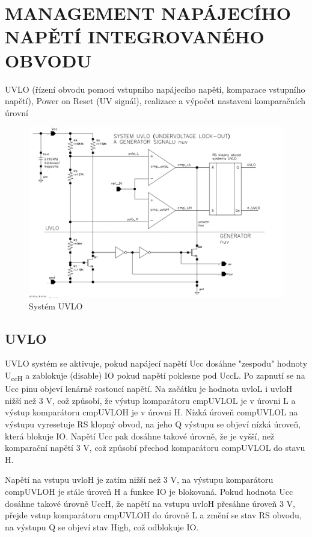 \section{MANAGEMENT NAPÁJECÍHO NAPĚTÍ INTEGROVANÉHO OBVODU}
UVLO (řízení obvodu pomocí vstupního napájecího napětí, komparace vstupního napětí), Power on Reset (UV signál), realizace a výpočet nastaveni komparačních úrovní

\begin{figure}[h]
   \begin{center}
     \includegraphics[scale=0.5]{images/UVLO.png}
   \end{center}
   \caption{Systém UVLO}
\end{figure}

\subsection{UVLO}
UVLO systém se aktivuje, pokud napájecí napětí Ucc dosáhne "zespodu" hodnoty U\textsubscript{ccH} a zablokuje (disable) IO pokud napětí poklesne pod UccL. Po zapnutí se na Ucc pinu objeví lenárně rostoucí napětí. Na začátku je hodnota uvloL i uvloH nižší než 3 V, což způsobí, že výstup komparátoru cmpUVLOL je v úrovni L a výstup komparátoru cmpUVLOH je v úrovni H. Nízká úroveň compUVLOL na výstupu vyresetuje RS klopný obvod, na jeho Q výstupu se objeví nízká úroveň, která blokuje IO. Napětí Ucc pak dosáhne takové úrovně, že je vyšší, než komparační napětí 3 V, což způsobí přechod komparátoru compUVLOL do stavu H.

Napětí na vstupu uvloH je zatím nižší než 3 V, na výstupu komparátoru compUVLOH je stále úroveň H a funkce IO je blokovaná. Pokud hodnota Ucc dosáhne takové úrovně UccH, že napětí na vstupu uvloH přesáhne úroveň 3 V, přejde vstup komparátoru cmpUVLOH do úrovně L a změní se stav RS obvodu, na výstupu Q se objeví stav High, což odblokuje IO.

